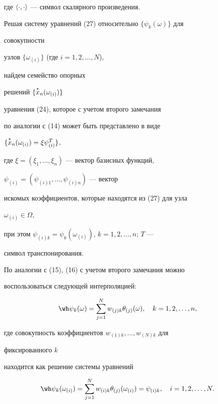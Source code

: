 где $\langle\cdot,\cdot\rangle$ --- символ скалярного произведения.





Решая систему уравнений (27) относительно $\{\psi_k(\omega)\}$ для


совокупности


узлов $\{\omega_{(i)}\}$ (где $i=1,2,\dotsc,N$),


найдем семейство опорных


решений $\{\overset{*}{x}{}_n(\omega_{(i)})\}$


уравнения (24), которое с учетом второго замечания


по аналогии с (14) может быть представлено в виде


$\{\overset{*}{x}{}_n(\omega_{(i)})=\xi\psi^T_{(i)}\}$,


где $\xi=(\xi_1,\dotsc,\xi_n)$ --- вектор базисных функций,


$\psi_{(i)}=(\psi_{(i)1},\dotsc,\psi_{(i)n})$ --- вектор


искомых коэффициентов, которые находятся из (27) для узла


$\omega_{(i)}\in\Omega$,


при этом $\psi_{(i)k}=\psi_k(\omega_{(i)})$, $k=1,2,\dotsc,n$; $T$ ---


символ транспонирования.





По аналогии с (15), (16) с учетом второго замечания можно


воспользоваться следующей интерполяцией:


\begin{equation}


\wh\psi_k(\omega)=\sum^N_{j=1}w_{(j)k}\theta_{(j)}(\omega),


\quad k=1,2,\dotsc,n,


\end{equation}


где совокупность коэффициентов $w_{(1)k},\dotsc,w_{(N)k}$ для


фиксированного $k$


находится как решение системы уравнений


\begin{equation}


\wh\psi_k(\omega_{(i)})=\sum^N_{j=1}


w_{(i)k}\theta_{(j)}(\omega_{(i)})=


\psi_{(i)k},\quad i=1,2,\dotsc,N.


\end{equation}





